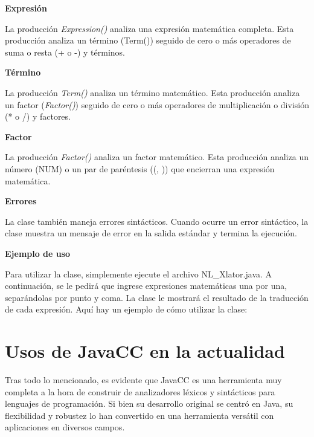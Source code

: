 \phantom{text}

\noindent \textbf{Expresión}

\phantom{text}

\noindent La producción \textit{Expression()} analiza una expresión matemática completa. Esta producción analiza un término (Term()) seguido de cero o más operadores de suma o resta (+ o -) y términos.

\phantom{text}

\noindent \textbf{Término}

\phantom{text}

\noindent La producción \textit{Term()} analiza un término matemático. Esta producción analiza un factor (\textit{Factor()}) seguido de cero o más operadores de multiplicación o división (* o /) y factores.

\phantom{text}

\noindent \textbf{Factor}

\phantom{text}

\noindent La producción \textit{Factor()} analiza un factor matemático. Esta producción analiza un número (NUM) o un par de paréntesis ((, )) que encierran una expresión matemática.

\phantom{text}

\noindent \textbf{Errores}

\phantom{text}

\noindent La clase también maneja errores sintácticos. Cuando ocurre un error sintáctico, la clase muestra un mensaje de error en la salida estándar y termina la ejecución.

\phantom{text}

\noindent \textbf{Ejemplo de uso}

\phantom{text}

\noindent Para utilizar la clase, simplemente ejecute el archivo NL\_Xlator.java. A continuación, se le pedirá que ingrese expresiones matemáticas una por una, separándolas por punto y coma. La clase le mostrará el resultado de la traducción de cada expresión.
Aquí hay un ejemplo de cómo utilizar la clase:

\section{Usos de JavaCC en la actualidad}

\noindent Tras todo lo mencionado, es evidente que JavaCC es una herramienta muy completa a la hora de construir de analizadores léxicos y sintácticos para lenguajes de programación. Si bien su desarrollo original se centró en Java, su flexibilidad y robustez lo han convertido en una herramienta versátil con aplicaciones en diversos campos.

